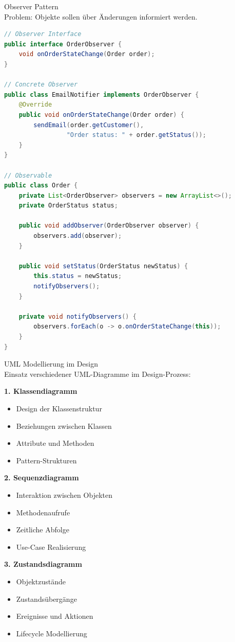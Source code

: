 \begin{example2}{Observer Pattern}\\
Problem: Objekte sollen über Änderungen informiert werden.

\begin{lstlisting}[language=Java, style=base]
// Observer Interface
public interface OrderObserver {
    void onOrderStateChange(Order order);
}

// Concrete Observer
public class EmailNotifier implements OrderObserver {
    @Override
    public void onOrderStateChange(Order order) {
        sendEmail(order.getCustomer(), 
                 "Order status: " + order.getStatus());
    }
}

// Observable
public class Order {
    private List<OrderObserver> observers = new ArrayList<>();
    private OrderStatus status;
    
    public void addObserver(OrderObserver observer) {
        observers.add(observer);
    }
    
    public void setStatus(OrderStatus newStatus) {
        this.status = newStatus;
        notifyObservers();
    }
    
    private void notifyObservers() {
        observers.forEach(o -> o.onOrderStateChange(this));
    }
}
\end{lstlisting}
\end{example2}

\begin{KR}{UML Modellierung im Design}\\
Einsatz verschiedener UML-Diagramme im Design-Prozess:

\textbf{1. Klassendiagramm}
\begin{itemize}
    \item Design der Klassenstruktur
    \item Beziehungen zwischen Klassen
    \item Attribute und Methoden
    \item Pattern-Strukturen
\end{itemize}

\textbf{2. Sequenzdiagramm}
\begin{itemize}
    \item Interaktion zwischen Objekten
    \item Methodenaufrufe
    \item Zeitliche Abfolge
    \item Use-Case Realisierung
\end{itemize}

\textbf{3. Zustandsdiagramm}
\begin{itemize}
    \item Objektzustände
    \item Zustandsübergänge
    \item Ereignisse und Aktionen
    \item Lifecycle Modellierung
\end{itemize}
\end{KR}

